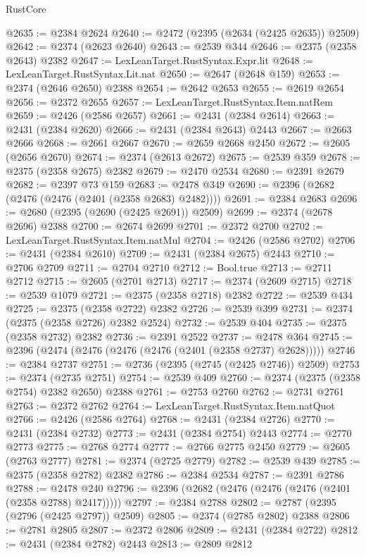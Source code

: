 \begin{lexlean}{RustCore}
\begin{coremodule}
@2635 := @2384 @2624
@2640 := @2472 (@2395 (@2634 (@2425 @2635)) @2509)
@2642 := @2374 (@2623 @2640)
@2643 := @2539 @344
@2646 := @2375 (@2358 @2643) @2382
@2647 := LexLeanTarget.RustSyntax.Expr.lit
@2648 := LexLeanTarget.RustSyntax.Lit.nat
@2650 := @2647 (@2648 @159)
@2653 := @2374 (@2646 @2650) @2388
@2654 := @2642 @2653
@2655 := @2619 @2654
@2656 := @2372 @2655
@2657 := LexLeanTarget.RustSyntax.Item.natRem
@2659 := @2426 (@2586 @2657)
@2661 := @2431 (@2384 @2614)
@2663 := @2431 (@2384 @2620)
@2666 := @2431 (@2384 @2643) @2443
@2667 := @2663 @2666
@2668 := @2661 @2667
@2670 := @2659 @2668 @2450
@2672 := @2605 (@2656 @2670)
@2674 := @2374 (@2613 @2672)
@2675 := @2539 @359
@2678 := @2375 (@2358 @2675) @2382
@2679 := @2470 @2534
@2680 := @2391 @2679
@2682 := @2397 @73 @159
@2683 := @2478 @349
@2690 := @2396 (@2682 (@2476 (@2476 (@2401 (@2358 @2683) @2482))))
@2691 := @2384 @2683
@2696 := @2680 (@2395 (@2690 (@2425 @2691)) @2509)
@2699 := @2374 (@2678 @2696) @2388
@2700 := @2674 @2699
@2701 := @2372 @2700
@2702 := LexLeanTarget.RustSyntax.Item.natMul
@2704 := @2426 (@2586 @2702)
@2706 := @2431 (@2384 @2610)
@2709 := @2431 (@2384 @2675) @2443
@2710 := @2706 @2709
@2711 := @2704 @2710
@2712 := Bool.true
@2713 := @2711 @2712
@2715 := @2605 (@2701 @2713)
@2717 := @2374 (@2609 @2715)
@2718 := @2539 @1079
@2721 := @2375 (@2358 @2718) @2382
@2722 := @2539 @434
@2725 := @2375 (@2358 @2722) @2382
@2726 := @2539 @399
@2731 := @2374 (@2375 (@2358 @2726) @2382 @2524)
@2732 := @2539 @404
@2735 := @2375 (@2358 @2732) @2382
@2736 := @2391 @2522
@2737 := @2478 @364
@2745 := @2396 (@2474 (@2476 (@2476 (@2476 (@2401 (@2358 @2737) @2628)))))
@2746 := @2384 @2737
@2751 := @2736 (@2395 (@2745 (@2425 @2746)) @2509)
@2753 := @2374 (@2735 @2751)
@2754 := @2539 @409
@2760 := @2374 (@2375 (@2358 @2754) @2382 @2650) @2388
@2761 := @2753 @2760
@2762 := @2731 @2761
@2763 := @2372 @2762
@2764 := LexLeanTarget.RustSyntax.Item.natQuot
@2766 := @2426 (@2586 @2764)
@2768 := @2431 (@2384 @2726)
@2770 := @2431 (@2384 @2732)
@2773 := @2431 (@2384 @2754) @2443
@2774 := @2770 @2773
@2775 := @2768 @2774
@2777 := @2766 @2775 @2450
@2779 := @2605 (@2763 @2777)
@2781 := @2374 (@2725 @2779)
@2782 := @2539 @439
@2785 := @2375 (@2358 @2782) @2382
@2786 := @2384 @2534
@2787 := @2391 @2786
@2788 := @2478 @240
@2796 := @2396 (@2682 (@2476 (@2476 (@2476 (@2401 (@2358 @2788) @2417)))))
@2797 := @2384 @2788
@2802 := @2787 (@2395 (@2796 (@2425 @2797)) @2509)
@2805 := @2374 (@2785 @2802) @2388
@2806 := @2781 @2805
@2807 := @2372 @2806
@2809 := @2431 (@2384 @2722)
@2812 := @2431 (@2384 @2782) @2443
@2813 := @2809 @2812

\end{coremodule}
\end{lexlean}
